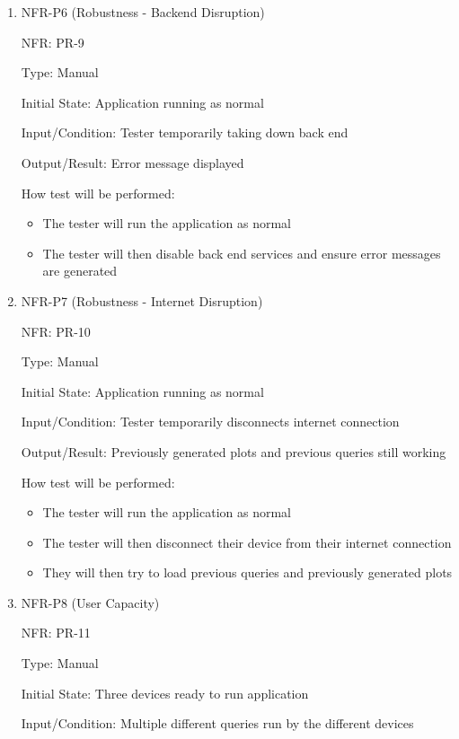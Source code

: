 \documentclass[12pt, titlepage]{article}
\begin{document}
\begin{enumerate}
  \item{NFR-P6 (Robustness - Backend Disruption)\\}

  NFR: PR-9
  
  Type: Manual
  
  Initial State: Application running as normal
  
  Input/Condition: Tester temporarily taking down back end
  
  Output/Result: Error message displayed
  
  How test will be performed:
  \begin{itemize}
    \item The tester will run the application as normal
    \item The tester will then disable back end services and ensure error
    messages are generated
  \end{itemize}

  \item{NFR-P7 (Robustness - Internet Disruption)\\}

  NFR: PR-10
  
  Type: Manual
  
  Initial State: Application running as normal
  
  Input/Condition: Tester temporarily disconnects internet connection

  Output/Result: Previously generated plots and previous queries still working
  
  How test will be performed:
  \begin{itemize}
    \item The tester will run the application as normal
    \item The tester will then disconnect their device from their internet connection
    \item They will then try to load previous queries and previously generated plots
  \end{itemize}

  \item{NFR-P8 (User Capacity)\\}
  
  NFR: PR-11

  Type: Manual
  
  Initial State: Three devices ready to run application
  
  Input/Condition: Multiple different queries run by the different devices
  

\end{enumerate}
\end{document}
